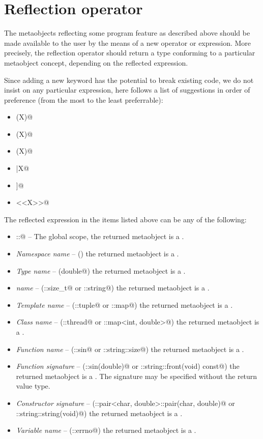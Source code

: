 \section{Reflection operator}

The metaobjects reflecting some program feature \verb@X@ as
described above should be made available to the user by
the means of a new operator or expression.
More precisely, the reflection operator should return a type conforming to a particular
metaobject concept, depending on the reflected expression.

Since adding a new keyword has the potential to break existing code,
we do not insist on any particular expression, here follows a list of suggestions
in order of preference (from the most to the least preferrable):

\begin{itemize}
\item{\verb@mirrored(X)@}
\item{\verb@reflected(X)@}
\item{\verb@reflexpr(X)@}
\item{\verb@|X@}
\item{\verb@[[X]]@}
\item{\verb@<<X>>@}
\end{itemize}

The reflected expression \verb@X@ in the items listed above can be any of the following:

\begin{itemize}
\item{\verb@::@} -- The global scope, the returned metaobject is a {}.
\item{{\em Namespace name}} -- (\verb@std@) the returned metaobject is a {}.
\item{{\em Type name}} -- (\verb@long double@) the returned metaobject is a {}.
\item{{\em \verb@typedef@ name}} -- (\verb@std::size_t@ or \verb@std::string@)
     the returned metaobject is a {}.
\item{{\em Template name}} -- (\verb@std::tuple@ or \verb@std::map@)
     the returned metaobject is a {}.
\item{{\em Class name}} -- (\verb@std::thread@ or \verb@std::map<int, double>@)
     the returned metaobject is a {}.
\item{{\em Function name}} -- (\verb@std::sin@ or \verb@std::string::size@) the returned metaobject
     is a {}.
\item{{\em Function signature}} -- (\verb@std::sin(double)@ or \verb@std::string::front(void) const@)
     the returned metaobject is a {}. The signature may be specified without the
     return value type.
\item{{\em Constructor signature}} -- (\verb@std::pair<char, double>::pair(char, double)@
     or \verb@std::string::string(void)@) the returned metaobject is a {}.
\item{{\em Variable name}} -- (\verb@std::errno@) the returned metaobject is a {}.
\end{itemize}

